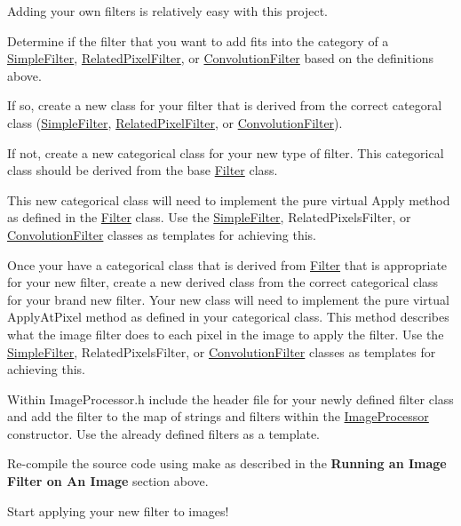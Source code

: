 Adding your own filters is relatively easy with this project.
\begin{DoxyEnumerate}
\item Determine if the filter that you want to add fits into the category of a \hyperlink{classSimpleFilter}{Simple\+Filter}, \hyperlink{classRelatedPixelFilter}{Related\+Pixel\+Filter}, or \hyperlink{classConvolutionFilter}{Convolution\+Filter} based on the definitions above.
\begin{DoxyEnumerate}
\item If so, create a new class for your filter that is derived from the correct categoral class (\hyperlink{classSimpleFilter}{Simple\+Filter}, \hyperlink{classRelatedPixelFilter}{Related\+Pixel\+Filter}, or \hyperlink{classConvolutionFilter}{Convolution\+Filter}).
\item If not, create a new categorical class for your new type of filter. This categorical class should be derived from the base \hyperlink{classFilter}{Filter} class.
\begin{DoxyEnumerate}
\item This new categorical class will need to implement the pure virtual {\ttfamily Apply} method as defined in the \hyperlink{classFilter}{Filter} class. Use the \hyperlink{classSimpleFilter}{Simple\+Filter}, Related\+Pixels\+Filter, or \hyperlink{classConvolutionFilter}{Convolution\+Filter} classes as templates for achieving this.
\end{DoxyEnumerate}
\end{DoxyEnumerate}
\item Once your have a categorical class that is derived from \hyperlink{classFilter}{Filter} that is appropriate for your new filter, create a new derived class from the correct categorical class for your brand new filter. Your new class will need to implement the pure virtual {\ttfamily Apply\+At\+Pixel} method as defined in your categorical class. This method describes what the image filter does to each pixel in the image to apply the filter. Use the \hyperlink{classSimpleFilter}{Simple\+Filter}, Related\+Pixels\+Filter, or \hyperlink{classConvolutionFilter}{Convolution\+Filter} classes as templates for achieving this.
\item Within {\ttfamily Image\+Processor.\+h} include the header file for your newly defined filter class and add the filter to the map of strings and filters within the \hyperlink{classImageProcessor}{Image\+Processor} constructor. Use the already defined filters as a template.
\item Re-\/compile the source code using {\ttfamily make} as described in the {\bfseries Running an Image Filter on An Image} section above.
\item Start applying your new filter to images!
\end{DoxyEnumerate}

